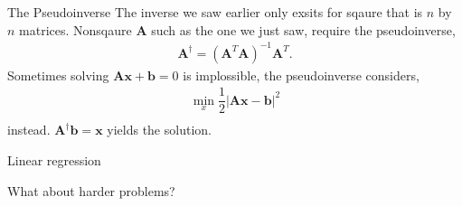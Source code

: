 \documentclass[notes]{beamer}
\begin{document}
    \begin{frame}{The Pseudoinverse \cite{strang2009introduction,deisenroth2020mathematics}}
      The inverse we saw earlier only exsits for sqaure that is $n$ by $n$ matrices.
      Nonsqaure $\mathbf{A}$ such as the one we just saw, require the pseudoinverse,
        \begin{align}
          \mathbf{A}^{\dagger} = (\mathbf{A}^T\mathbf{A})^{-1}\mathbf{A}^T .
        \end{align}
      Sometimes solving $\mathbf{A}\mathbf{x} + \mathbf{b} = 0$ is implossible,
      the pseudoinverse considers,
        \begin{align}
          \min_x \dfrac{1}{2}|\mathbf{A}\mathbf{x} - \mathbf{b}|^2 \\
        \end{align}
      instead. $\mathbf{A}^{\dagger} \mathbf{b} = \mathbf{x}$ yields the solution.

    \end{frame}

    \begin{frame}{Linear regression}
      \begin{figure}
        
      \end{figure}
    \end{frame}

    \begin{frame}{What about harder problems?}
      \begin{figure}
        
      \end{figure}
    \end{frame}
\end{document}
